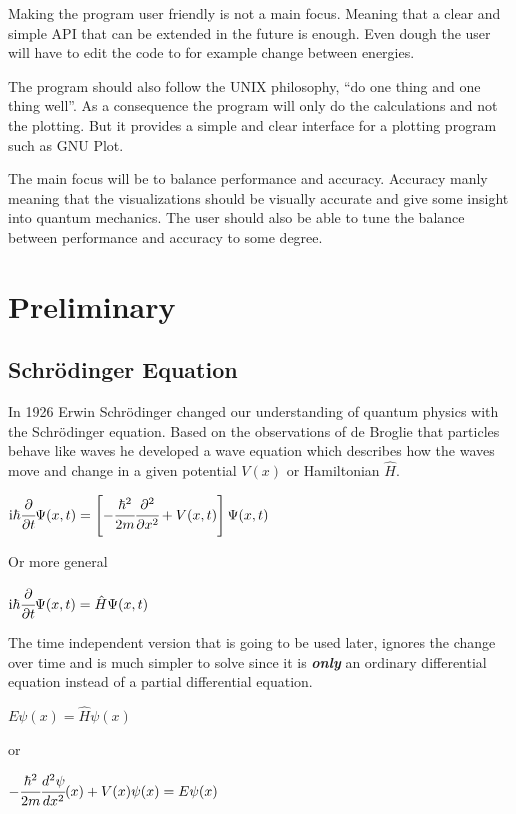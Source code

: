 \documentclass[11pt,DIV=10,final]{scrreprt} %
\newcommand{\mi}{{\text{i}}}
\begin{document}
Making the program user friendly is not a main focus. Meaning that a clear and simple API
that can be extended in the future is enough. Even dough the user will have to edit the code
to for example change between energies.

The program should also follow the UNIX philosophy, ``do one thing and one thing well''.
As a consequence the program will only do the calculations and not the plotting. But it
provides a simple and clear interface for a plotting program such as GNU Plot.

The main focus will be to balance performance and accuracy. Accuracy manly meaning that the
visualizations should be visually accurate and give some insight into quantum mechanics.
The user should also be able to tune the balance between performance and accuracy to some
degree.

\chapter{Preliminary}


\section{Schrödinger Equation}
In 1926 Erwin Schrödinger changed our understanding of quantum physics with the Schrödinger equation. Based on the observations of de Broglie that particles
behave like waves he developed a wave equation which describes how the waves move and change in a given potential $V(x)$ or Hamiltonian $\hat{H}$.
\begin{center}
\begin{math}
  \mi\hbar {\cfrac {\partial }{\partial t}}\Psi (x,t)=\left[-{\cfrac {\hbar ^{2}}{2m}}{\cfrac {\partial ^{2}}{\partial x^{2}}}+V(x,t)\right]\Psi (x,t)
\end{math}
\end{center}
Or more general
\begin{center}
\begin{math}
  \mi\hbar {\cfrac {\partial }{\partial t}}\Psi (x,t)=\hat{H} \Psi(x,t)
\end{math}
\end{center}

The time independent version that is going to be used later, ignores the change over time and is much simpler to solve since it is \emph{\textbf{only}} an ordinary differential equation instead of a
partial differential equation.
\begin{center}
\begin{math}
  E \psi (x)=\hat{H} \psi(x)
\end{math}
\end{center}
or
\begin{center}
\begin{math}
  -{\cfrac{\hbar^{2}}{2m}}  \cfrac{d^{2} \psi}{dx^{2}} (x) + V(x) \psi(x) = E \psi(x)
\end{math}
\end{center}
\end{document}
